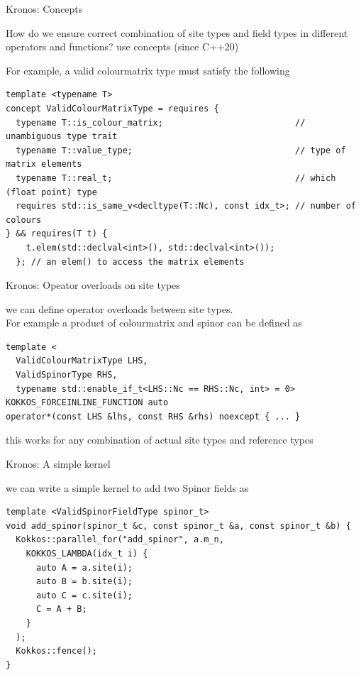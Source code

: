 \begin{frame}[fragile]{Kronos: Concepts}

  \begin{bkalertblock}{How do we ensure correct combination of site types and field types in different operators and functions?}
    use concepts (since C++20)
  \end{bkalertblock}

  For example, a valid colourmatrix type must satisfy the following

  \begin{verbatim}
template <typename T>
concept ValidColourMatrixType = requires {
  typename T::is_colour_matrix;                          // unambiguous type trait
  typename T::value_type;                                // type of matrix elements
  typename T::real_t;                                    // which (float point) type
  requires std::is_same_v<decltype(T::Nc), const idx_t>; // number of colours
} && requires(T t) { 
    t.elem(std::declval<int>(), std::declval<int>()); 
  }; // an elem() to access the matrix elements
  \end{verbatim}

\end{frame}

\begin{frame}[fragile]{Kronos: Opeator overloads on site types}

  we can define operator overloads between site types.\\

  For example a product of colourmatrix and spinor can be defined as

  \begin{verbatim}
template <
  ValidColourMatrixType LHS,
  ValidSpinorType RHS,
  typename std::enable_if_t<LHS::Nc == RHS::Nc, int> = 0>
KOKKOS_FORCEINLINE_FUNCTION auto
operator*(const LHS &lhs, const RHS &rhs) noexcept { ... }
  \end{verbatim}

  this works for any combination of actual site types and reference types

\end{frame}

\begin{frame}[fragile]{Kronos: A simple kernel}

  we can write a simple kernel to add two Spinor fields as\\

  \begin{verbatim}
template <ValidSpinorFieldType spinor_t>
void add_spinor(spinor_t &c, const spinor_t &a, const spinor_t &b) {
  Kokkos::parallel_for("add_spinor", a.m_n,
    KOKKOS_LAMBDA(idx_t i) {
      auto A = a.site(i);
      auto B = b.site(i);
      auto C = c.site(i);
      C = A + B;
    }
  );
  Kokkos::fence();
}
  \end{verbatim}

\end{frame}

